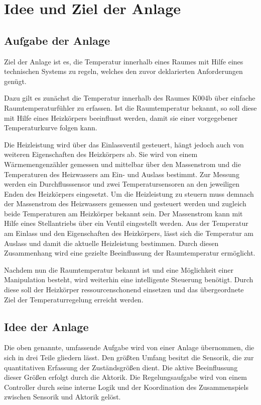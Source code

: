 \section{Idee und Ziel der Anlage}


\subsection{Aufgabe der Anlage}
Ziel der Anlage ist es, die Temperatur innerhalb eines Raumes mit Hilfe eines technischen Systems zu regeln, welches den zuvor deklarierten Anforderungen genügt.

Dazu gilt es zunächst die Temperatur innerhalb des Raumes K004b über einfache Raumtemperaturfühler zu erfassen. Ist die Raumtemperatur bekannt, so soll diese mit Hilfe eines Heizkörpers beeinflusst werden, damit sie einer vorgegebener Temperaturkurve folgen kann. 

Die Heizleistung wird über das Einlassventil gesteuert, hängt jedoch auch von weiteren Eigenschaften des Heizkörpers ab. Sie wird von einem Wärmemengenzähler gemessen und mittelbar über den Massenstrom und die Temperaturen des Heizwassers am Ein- und Auslass bestimmt. Zur Messung werden ein Durchflusssensor und zwei Temperatursensoren an den jeweiligen Enden des Heizkörpers eingesetzt. Um die Heizleistung zu steuern muss demnach der Massenstrom des Heizwassers gemessen und gesteuert werden und zugleich beide Temperaturen am Heizkörper bekannt sein. Der Massenstrom kann mit Hilfe eines Stellantriebs über ein Ventil  eingestellt werden. Aus der Temperatur am Einlass und den Eigenschaften des Heizkörpers, lässt sich die Temperatur am Auslass und damit die aktuelle Heizleistung bestimmen. Durch diesen Zusammenhang wird eine gezielte Beeinflussung der Raumtemperatur ermöglicht.

Nachdem nun die Raumtemperatur bekannt ist und eine Möglichkeit einer Manipulation besteht, wird weiterhin eine intelligente Steuerung benötigt. Durch diese soll der Heizkörper ressourcenschonend einsetzen und das übergeordnete Ziel der Temperaturregelung erreicht werden.

\subsection{Idee der Anlage}
\label{sub:idee}

Die oben genannte, umfassende Aufgabe wird von einer Anlage übernommen, die sich in drei Teile gliedern lässt. Den größten Umfang besitzt die Sensorik, die zur quantitativen Erfassung der Zuständsgrößen dient. Die aktive Beeinflussung dieser Größen erfolgt durch die Aktorik. Die Regelungsaufgabe wird von einem Controller durch seine interne Logik und der Koordination des Zusammenspiels zwischen Sensorik und Aktorik gelöst.

